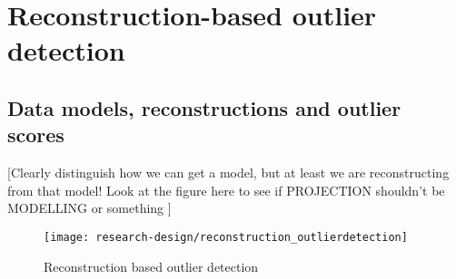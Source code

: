 \chapter{Reconstruction-based outlier detection}
\label{chap:reconstruction-detection}

%
%
%
%
%

\section{Data models, reconstructions and outlier scores}
[Clearly distinguish how we can get a model, but at least we are reconstructing from that model! Look at the figure here to see if PROJECTION shouldn't be MODELLING or something ]

\begin{figure}[h]
	\centering
	\texttt{[image: research-design/reconstruction\_outlierdetection]}
	\caption{Reconstruction based outlier detection}
	\label{fig:researchdesign_reconstruction}
\end{figure}


